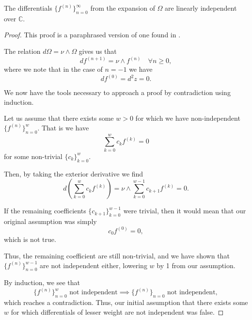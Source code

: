 \begin{lemma}
    The differentials $\{f^{(n)}\}_{n=0}^{\infty}$ from the expansion of $\Omega$ are linearly independent over $\mathbb C$.
\end{lemma}
\begin{proof}
    This proof is a paraphrased version of one found in \cite{BL13}.

    The relation $d\Omega = \nu \wedge \Omega$ gives us that
    \begin{equation}
        df^{(n+1)} = \nu \wedge f^{(n)} \quad \forall n \geq 0,
    \end{equation}
    where we note that in the case of $n=-1$ we have
    \begin{equation}
        df^{(0)} = d^2 z = 0.
    \end{equation}

    We now have the tools necessary to approach a proof by contradiction using induction.

    Let us assume that there exists some $w > 0$ for which we have non-independent $\{f^{(n)} \}_{n=0}^w$. That is we have
    \begin{equation}
        \sum_{k=0}^{w} c_{k} f^{(k)} = 0
    \end{equation}
    for some non-trivial $\{c_{k}\}_{k=0}^w$.

    Then, by taking the exterior derivative we find
    \begin{equation}
        d\left(\sum_{k=0}^{w} c_{k} f^{(k)}\right) = \nu \wedge \sum_{k=0}^{w-1} c_{k+1} f^{(k)} = 0.
    \end{equation}

    If the remaining coefficients $\{c_{k+1}\}_{k=0}^{w-1}$ were trivial, then it would mean that our original assumption was simply
    \begin{equation}
        c_0 f^{(0)} = 0,
    \end{equation}
    which is not true.

    Thus, the remaining coefficient are still non-trivial, and we have shown that $\{f^{(n)}\}_{n=0}^{w-1}$ are not independent either, lowering $w$ by 1 from our assumption.

    By induction, we see that
    \begin{equation}
        \{f^{(n)}\}_{n=0}^w \text{ not independent} \implies \{f^{(n)}\}_{n=0} \text{ not independent},
    \end{equation}
    which reaches a contradiction. Thus, our initial assumption that there exists some $w$ for which differentials of lesser weight are not independent was false.
\end{proof}

